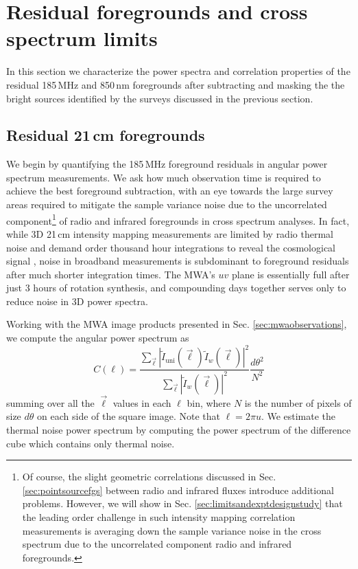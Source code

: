 \documentclass[numberedappendix]{emulateapj}
\begin{document}
\section{Residual foregrounds and cross spectrum limits}

In this section we characterize the power spectra and correlation properties of the residual 185\,MHz and 850\,nm foregrounds after subtracting and masking  the the bright sources identified by the surveys discussed in the previous section.

\subsection{Residual 21\,cm foregrounds}
\label{sec:res21fgs}

We begin by quantifying the 185\,MHz foreground residuals in angular power spectrum measurements. We ask how much observation time is required to achieve the best foreground subtraction, with an eye towards the large survey areas required to mitigate the sample variance noise due to the uncorrelated component\footnote{Of course, the slight geometric correlations discussed in Sec. \ref{sec:pointsourcefgs} between radio and infrared fluxes introduce additional problems. However, we will show in Sec. \ref{sec:limitsandexptdesignstudy} that the leading order challenge in such intensity mapping correlation measurements is averaging down the sample variance noise in the cross spectrum due to the uncorrelated component radio and infrared foregrounds.} of radio and infrared foregrounds in cross spectrum analyses. In fact, while 3D 21\,cm intensity mapping measurements are limited by radio thermal noise and demand order thousand hour integrations to reveal the cosmological signal \citep[e.g.][]{beardsley13,PoberNextGen}, noise in broadband measurements is subdominant to foreground residuals after much shorter integration times. The MWA's $uv$ plane is essentially full after just 3 hours of rotation synthesis, and compounding days together serves only to reduce noise in 3D power spectra. 

Working with the MWA image products presented in Sec. \ref{sec:mwaobservations}, we compute the angular power spectrum as
\begin{equation}
	C(\ell)=\frac{\sum_{\vec{\ell}}|\tilde{I}_\text{uni}(\vec{\ell})\tilde{I}_w(\vec{\ell})|^2}{\sum_{\vec{\ell}}|\tilde{I}_w(\vec{\ell})|^2}\frac{d\theta^2}{N^2}
\end{equation}
summing over all the $\vec{\ell}$ values in each $\ell$ bin, where $N$ is the number of pixels of size $d\theta$ on each side of the square image. Note that $\ell=2\pi u$. We estimate the thermal noise power spectrum by computing the power spectrum of the difference cube which contains only thermal noise.
\end{document}
